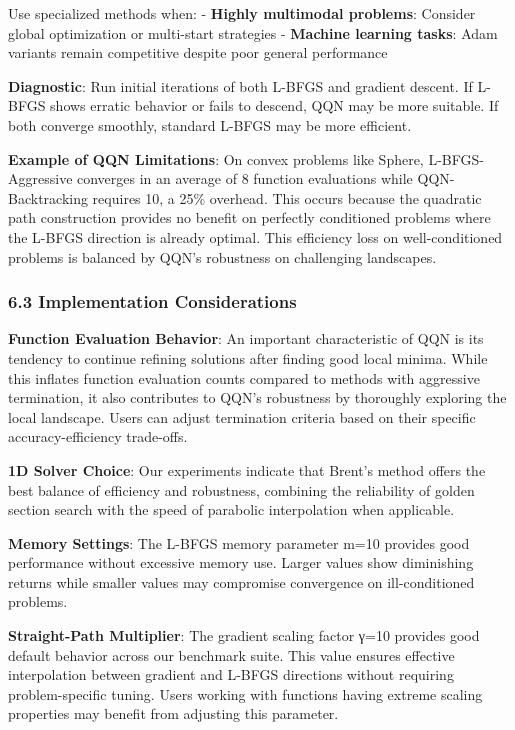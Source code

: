 Use specialized methods when:
- \textbf{Highly multimodal problems}: Consider global optimization or multi-start strategies
- \textbf{Machine learning tasks}: Adam variants remain competitive despite poor general performance

\textbf{Diagnostic}: Run initial iterations of both L-BFGS and gradient descent. If L-BFGS shows
erratic behavior or fails to descend, QQN may be more suitable. If both converge smoothly,
standard L-BFGS may be more efficient.

\textbf{Example of QQN Limitations}: On convex problems like Sphere, L-BFGS-Aggressive converges in
an average of 8 function evaluations while QQN-Backtracking requires 10, a 25\% overhead. This occurs because the quadratic
path construction provides no benefit on perfectly conditioned problems where the L-BFGS direction is already optimal.
This efficiency loss on well-conditioned problems is balanced by QQN's robustness on challenging landscapes.

\hypertarget{implementation-considerations}{%
\subsubsection{6.3 Implementation Considerations}\label{implementation-considerations}}

\textbf{Function Evaluation Behavior}: An important characteristic of QQN is its tendency to continue refining solutions
after finding good local minima. While this inflates function evaluation counts compared to methods with aggressive
termination, it also contributes to QQN's robustness by thoroughly exploring the local landscape. Users can adjust
termination criteria based on their specific accuracy-efficiency trade-offs.

\textbf{1D Solver Choice}: Our experiments indicate that Brent's method offers the best balance of efficiency and robustness,
combining the reliability of golden section search with the speed of parabolic interpolation when applicable.

\textbf{Memory Settings}: The L-BFGS memory parameter m=10 provides good performance without excessive memory use. Larger
values show diminishing returns while smaller values may compromise convergence on ill-conditioned problems.

\textbf{Straight-Path Multiplier}: The gradient scaling factor γ=10 provides good default behavior across our benchmark suite. This value ensures effective interpolation between gradient and L-BFGS directions without requiring problem-specific tuning. Users working with functions having extreme scaling properties may benefit from adjusting this parameter.

